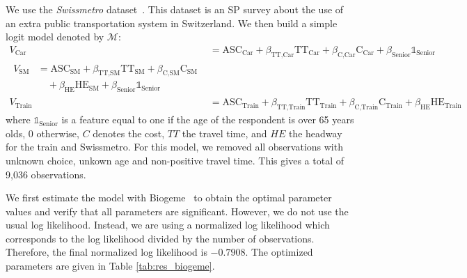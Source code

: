 \documentclass[conference]{IEEEtran}
\begin{document}
We use the {\it Swissmetro} dataset~\cite{bierlaire_acceptance_2001}. This dataset is an SP survey about the use of an extra public transportation system in Switzerland. We then build a simple logit model denoted by $\mathcal{M}$:
\begin{align}
\label{eq:model}
V_{\text{Car}} &= \text{ASC}_{\text{Car}} + \beta_{\text{TT,Car}} \text{TT}_{\text{Car}} + \beta_{\text{C,Car}} \text{C}_{\text{Car}} + \beta_{\text{Senior}}\mathbb{1}_{\text{Senior}} \nonumber \\
\begin{split}
V_{\text{SM}} &= \text{ASC}_{\text{SM}} + \beta_{\text{TT,SM}} \text{TT}_{\text{SM}} + \beta_{\text{C,SM}} \text{C}_{\text{SM}} \\
& \quad + \beta_{\text{HE}} \text{HE}_{\text{SM}} + \beta_{\text{Senior}}\mathbb{1}_{\text{Senior}}
\end{split} \\
V_{\text{Train}} &= \text{ASC}_{\text{Train}} + \beta_{\text{TT,Train}} \text{TT}_{\text{Train}} + \beta_{\text{C,Train}} \text{C}_{\text{Train}} + \beta_{\text{HE}} \text{HE}_{\text{Train}} \nonumber
\end{align}
where $\mathbb{1}_{\text{Senior}}$ is a feature equal to one if the age of the respondent is over 65 years olds, 0 otherwise, $C$ denotes the cost, $TT$ the travel time, and $HE$ the headway for the train and Swissmetro. For this model, we removed all observations with unknown choice, unkown age and non-positive travel time. This gives a total of 9,036 observations. 
 
We first estimate the model with Biogeme~\cite{bierlaire_biogeme:_2003} to obtain the optimal parameter values and verify that all parameters are significant. However, we do not use the usual log likelihood. Instead, we are using a normalized log likelihood which corresponds to the log likelihood divided by the number of observations. Therefore, the final normalized log likelihood is $-0.7908$. The optimized parameters are given in Table \ref{tab:res_biogeme}.
\end{document}
